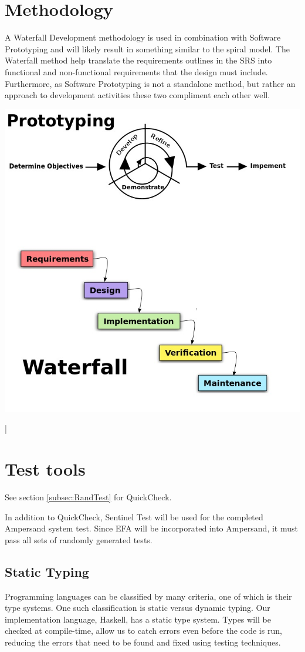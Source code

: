 \documentclass[12pt]{report}
\begin{document}
\section{Methodology}\label{sec:Methodology}
A Waterfall Development methodology is used in combination with Software 
Prototyping and will likely result in something similar to the spiral model. 
The Waterfall method help translate the requirements outlines in the SRS into 
functional and non-functional requirements that the design must include. 
Furthermore, as Software Prototyping is not a standalone method, but rather an 
approach to development activities these two compliment each other well.
\begin{center}
\includegraphics[scale=0.5]{testing}
\end{center}|
\section{Test tools}\label{sec:TestTools}
See section \ref{subsec:RandTest} for QuickCheck.

In addition to QuickCheck, Sentinel Test will be used for the completed 
Ampersand system test. Since EFA will be incorporated into Ampersand, it must 
pass all sets of randomly generated tests. 

\subsection{Static Typing}\label{subsec:Static}
Programming languages can be classified by many criteria, one of which is their
type systems. One such classification is static versus dynamic typing. Our
implementation language, Haskell, has a static type system. Types will be
checked at compile-time, allow us to catch errors even before the code is run,
reducing the errors that need to be found and fixed using testing techniques. 
\end{document}
